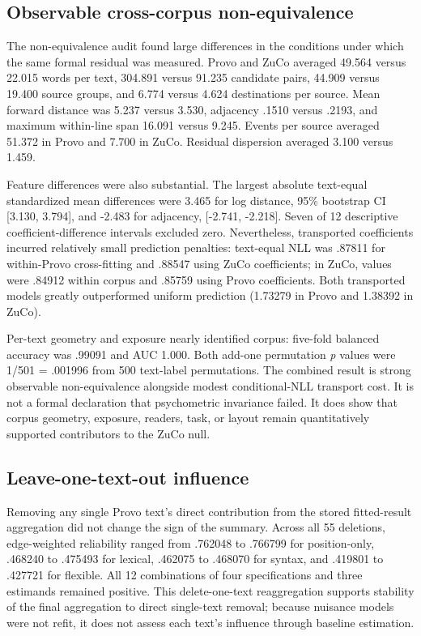 \documentclass[11pt]{article}
\begin{document}


\subsection{Observable cross-corpus non-equivalence}

The non-equivalence audit found large differences in the conditions under which the same formal residual was measured. Provo and ZuCo averaged 49.564 versus 22.015 words per text, 304.891 versus 91.235 candidate pairs, 44.909 versus 19.400 source groups, and 6.774 versus 4.624 destinations per source. Mean forward distance was 5.237 versus 3.530, adjacency .1510 versus .2193, and maximum within-line span 16.091 versus 9.245. Events per source averaged 51.372 in Provo and 7.700 in ZuCo. Residual dispersion averaged 3.100 versus 1.459.

Feature differences were also substantial. The largest absolute text-equal standardized mean differences were 3.465 for log distance, 95\% bootstrap CI [3.130, 3.794], and -2.483 for adjacency, [-2.741, -2.218]. Seven of 12 descriptive coefficient-difference intervals excluded zero. Nevertheless, transported coefficients incurred relatively small prediction penalties: text-equal NLL was .87811 for within-Provo cross-fitting and .88547 using ZuCo coefficients; in ZuCo, values were .84912 within corpus and .85759 using Provo coefficients. Both transported models greatly outperformed uniform prediction (1.73279 in Provo and 1.38392 in ZuCo).

Per-text geometry and exposure nearly identified corpus: five-fold balanced accuracy was .99091 and AUC 1.000. Both add-one permutation \emph{p} values were 1/501 = .001996 from 500 text-label permutations. The combined result is strong observable non-equivalence alongside modest conditional-NLL transport cost. It is not a formal declaration that psychometric invariance failed. It does show that corpus geometry, exposure, readers, task, or layout remain quantitatively supported contributors to the ZuCo null.

\subsection{Leave-one-text-out influence}

Removing any single Provo text's direct contribution from the stored fitted-result aggregation did not change the sign of the summary. Across all 55 deletions, edge-weighted reliability ranged from .762048 to .766799 for position-only, .468240 to .475493 for lexical, .462075 to .468070 for syntax, and .419801 to .427721 for flexible. All 12 combinations of four specifications and three estimands remained positive. This delete-one-text reaggregation supports stability of the final aggregation to direct single-text removal; because nuisance models were not refit, it does not assess each text's influence through baseline estimation.
\end{document}
